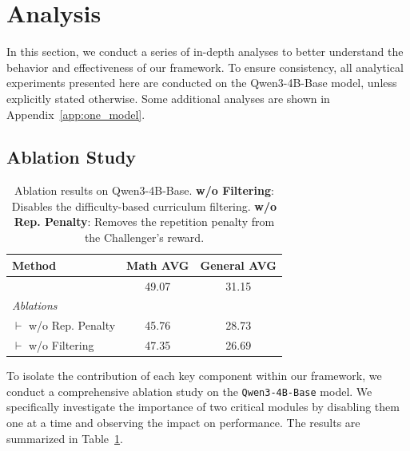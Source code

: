 \section{Analysis}
In this section, we conduct a series of in-depth analyses to better understand the behavior and effectiveness of our \method{} framework. To ensure consistency, all analytical experiments presented here are conducted on the Qwen3-4B-Base model, unless explicitly stated otherwise. Some additional analyses are shown in Appendix~\ref{app:one_model}.


\subsection{Ablation Study}
\label{sec:ablation}

\vspace{-10pt}



\begin{table}
    \vspace{-0.2in} %
    \centering
    \small
    \caption{Ablation results on Qwen3-4B-Base.  \textbf{w/o Filtering}: Disables the difficulty-based curriculum filtering. \textbf{w/o Rep. Penalty}: Removes the repetition penalty from the Challenger's reward.}
    \label{tab:ablation_study}
    \vspace{-0.1in}
    \begin{tabular}{@{}lcc@{}}
        \toprule
        \textbf{Method} & \textbf{Math AVG} & \textbf{General AVG} \\
        \midrule
        \method{} & 49.07 & 31.15 \\
        \midrule
        \textit{Ablations} & & \\
        \quad $\vdash$ w/o Rep. Penalty  & 45.76 & 28.73 \\
        \quad $\vdash$ w/o Filtering     &   47.35  &   26.69  \\
        \bottomrule
    \end{tabular}
    \vspace{-0.15in}
\end{table}

To isolate the contribution of each key component within our \method{} framework, we conduct a comprehensive ablation study on the \texttt{Qwen3-4B-Base} model. We specifically investigate the importance of two critical modules by disabling them one at a time and observing the impact on performance. The results are summarized in Table~\ref{tab:ablation_study}.

